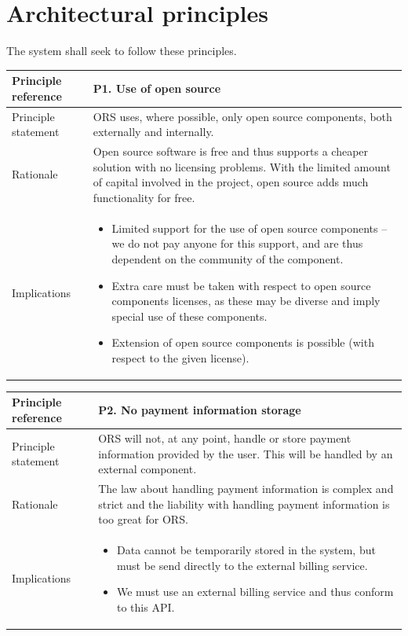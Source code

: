\documentclass[a4paper,11pt]{report}
\begin{document}
\section{Architectural principles}
\label{sec:arch-princ}
The system shall seek to follow these principles.
\begin{center}
  \begin{tabular}[h!]{| >{\columncolor{gray}}p{} | p{} |}
    \hline
    Principle reference & P1. Use of open source\\
    \hline
    Principle statement & ORS uses, where possible, only open source components, both externally and internally. \\
    \hline
    Rationale & Open source software is free and thus supports a cheaper solution with no licensing problems. With the limited amount of capital involved in the project, open source adds much functionality for free.\\
    \hline
    Implications &
      \begin{itemize}
        \item Limited support for the use of open source components -- we do not pay anyone for this support, and are thus dependent on the community of the component.
        \item Extra care must be taken with respect to open source components licenses, as these may be diverse and imply special use of these components.
        \item Extension of open source components is possible (with respect to the given license).
      \end{itemize}\\
    \hline
  \end{tabular}
\end{center}

\begin{center}
  \begin{tabular}[h!]{| >{\columncolor{gray}}p{} | p{} |}
    \hline
    Principle reference & P2. No payment information storage\\
    \hline
    Principle statement & ORS will not, at any point, handle or store payment information provided by the user. This will be handled by an external component.\\
    \hline
    Rationale & The law about handling payment information is complex and strict and the liability with handling payment information is too great for ORS.\\
    \hline
    Implications &
      \begin{itemize}
        \item Data cannot be temporarily stored in the system, but must be send directly to the external billing service.
        \item We must use an external billing service and thus conform to this API.
      \end{itemize}\\
    \hline
  \end{tabular}
\end{center}
\end{document}
